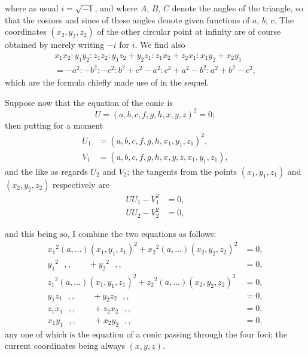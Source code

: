 \documentclass[11pt,a4paper]{book}
\providecommand{\between}{,}
\begin{document}
\newpage
\setcounter{page}{506}

where as usual $i = \sqrt{-1}$, and where $A$, $B$, $C$ denote the angles of the triangle, so that the cosines and sines of these angles denote given functions of $a$, $b$, $c$. The coordinates $(x_2, y_2, z_2)$ of the other circular point at infinity are of course obtained by merely writing $-i$ for $i$. We find also
\begin{multline*}
x_1x_2 : y_1y_2 : z_1z_2 : y_1z_2 + y_2z_1 : z_1x_2 + z_2x_1 : x_1y_2 + x_2y_1\\
= -a^2 : -b^2 : -c^2 : b^2 + c^2 - a^2 : c^2 + a^2 - b^2 : a^2 + b^2 - c^2,
\end{multline*}
which are the formula chiefly made use of in the sequel.

Suppose now that the equation of the conic is
\[
U = (a, b, c, f, g, h \between x, y, z)^2 = 0;
\]
then putting for a moment
\begin{align*}
U_1 &= (a, b, c, f, g, h \between x_1, y_1, z_1)^2,\\
V_1 &= (a, b, c, f, g, h \between x, y, z \between x_1, y_1, z_1),
\end{align*}
and the like as regards $U_2$ and $V_2$; the tangents from the points $(x_1, y_1, z_1)$ and $(x_2, y_2, z_2)$ respectively are
\begin{align*}
UU_1 - V_1^2 &= 0,\\
UU_2 - V_2^2 &= 0,
\end{align*}

\newpage
\setcounter{page}{507}

and this being so, I combine the two equations as follows:
\begin{align*}
x_1{}^2 (a, \ldots)(x_1, y_1, z_1)^2 + x_2{}^2 (a, \ldots)(x_2, y_2, z_2)^2 &= 0,\\
y_1{}^2 \,\,\,\, ,, \quad\quad + y_2{}^2 \,\,\,\, ,, \quad\quad &= 0,\\
z_1{}^2 (a, \ldots)(x_1, y_1, z_1)^2 + z_2{}^2 (a, \ldots)(x_2, y_2, z_2)^2 &= 0,\\
y_1z_1 \,\,\,\, ,, \quad\quad + y_2z_2 \,\,\,\, ,, \quad\quad &= 0,\\
z_1x_1 \,\,\,\, ,, \quad\quad + z_2x_2 \,\,\,\, ,, \quad\quad &= 0,\\
x_1y_1 \,\,\,\, ,, \quad\quad + x_2y_2 \,\,\,\, ,, \quad\quad &= 0,
\end{align*}
any one of which is the equation of a conic passing through the four foci; the current coordinates being always $(x, y, z)$.
\end{document}
